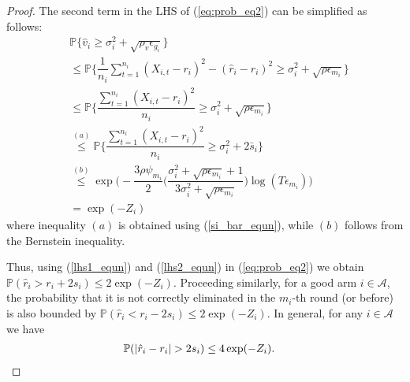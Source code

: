 \begin{proof}
 The second term in the LHS of (\ref{eq:prob_eq2}) can be simplified as follows:
\begin{align}
&\mathbb{P}\bigg\lbrace \hat{v}_{i}\geq \sigma_{i}^{2}+\sqrt{\rho_{v}\epsilon_{g_{i}}}\bigg\rbrace\nonumber\\
&\leq \mathbb{P}\bigg\lbrace \dfrac{1}{n_{i}}\sum_{t=1}^{n_{i}}(X_{i,t}-r_{i})^{2}-(\hat{r}_{i}-r_{i})^{2}\geq \sigma_{i}^{2}+\sqrt{\rho\epsilon_{m_{i}}}\bigg\rbrace\nonumber\\
&\leq \mathbb{P}\bigg\lbrace \dfrac{\sum_{t=1}^{n_{i}}(X_{i,t}-r_{i})^{2}}{n_{i}}\geq \sigma_{i}^{2}+\sqrt{\rho\epsilon_{m_{i}}} \bigg\rbrace\nonumber\\
&\overset{(a)}{\leq} \mathbb{P}\bigg\lbrace \dfrac{\sum_{t=1}^{n_{i}}(X_{i,t}-r_{i})^{2}}{n_{i}}\geq \sigma_{i}^{2} + 2\bar{s}_i\bigg\rbrace \nonumber\\
&\overset{(b)}{\leq} \exp\bigg(- \dfrac{3\rho\psi_{m_i}}{2} \bigg(\dfrac{\sigma_{i}^{2}+\sqrt{\rho\epsilon_{m_{i}}}+1}{3\sigma_{i}^{2}+\sqrt{\rho \epsilon_{m_{i}}}}\bigg) \log( T\epsilon_{m_{i}}) \bigg)\nonumber \\
& = \exp(-Z_i)
\label{lhs2_equn}
\end{align}
where inequality $(a)$ is obtained using (\ref{si_bar_equn}), while $(b)$ follows from the Bernstein inequality. 
  
Thus, using (\ref{lhs1_equn}) and (\ref{lhs2_equn}) in (\ref{eq:prob_eq2}) we obtain $\mathbb{P}(\hat{r}_{i}> r_{i} + 2s_{i})\le 2\exp(-Z_i)$.
Proceeding similarly, for a good arm $i\in\mathcal{A}$, the probability that it is not correctly eliminated in the $m_i$-th round (or before) is also bounded by $\mathbb{P}(\hat{r}_{i}< r_{i} - 2s_{i})\le 2\exp(-Z_i)$. In general, for any $i\in\mathcal{A}$ we have
\begin{align}
\Pb(|\hat{r}_i-r_i|>2s_i) 
&\le4\exp(-Z_i).
\label{final_bound_equn}
\end{align}
  

\end{proof}
